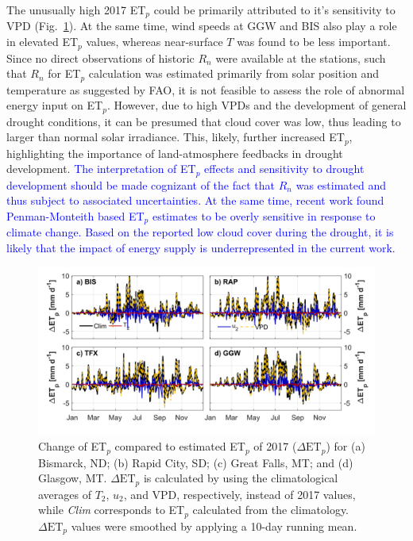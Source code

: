 \documentclass[hess, manuscript]{copernicus}
\def\TG{\textcolor{blue}}
\begin{document}
The unusually high 2017 ET$_p$ could be primarily attributed to it's sensitivity to VPD (Fig.~\ref{Fig:6}). At the same time, wind speeds at GGW and BIS also play a role in elevated ET$_p$ values, whereas near-surface $T$ was found to be less important. Since no direct observations of historic $R_n$ were available at the stations, such that $R_n$ for ET$_p$ calculation was estimated primarily from solar position and temperature as suggested by FAO, it is not feasible to assess the role of abnormal energy input on ET$_p$. However, due to high VPDs and the development of general drought conditions, it can be presumed that cloud cover was low, thus leading to larger than normal solar irradiance. This, likely, further increased ET$_p$, highlighting the importance of land-atmosphere feedbacks in drought development. \TG{The interpretation of ET$_p$ effects and sensitivity to drought development should be made cognizant of the fact that $R_n$ was estimated and thus subject to associated uncertainties. At the same time, recent work \citep{Milly_2016, Milly_2017} found Penman-Monteith based ET$_p$ estimates to be overly sensitive in response to climate change. Based on the reported low cloud cover during the drought, it is likely that the impact of energy supply is underrepresented in the current work.}    

%
\begin{figure}[t]
\includegraphics[width=12cm]{./Figures/Climatology_ETpClim_rev.png}
\caption{Change of ET$_p$ compared to estimated ET$_p$ of 2017  ($\Delta \mathrm{ET}_p$) for (a) Bismarck, ND; (b) Rapid City, SD; (c) Great Falls, MT; and (d) Glasgow, MT. $\Delta \mathrm{ET}_p$ is calculated by using the climatological averages of $T_2$, $u_2$, and VPD, respectively, instead of 2017 values, while \emph{Clim} corresponds to ET$_p$ calculated from the climatology. $\Delta \mathrm{ET}_p$  values were smoothed by applying a 10-day running mean.
}\label{Fig:6}
\end{figure}
\end{document}
